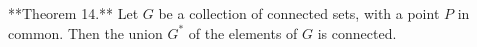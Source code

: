 **Theorem 14.** Let $G$ be a collection of connected sets, with a point $P$ in common. Then the union $G^*$ of the elements of $G$ is connected.
